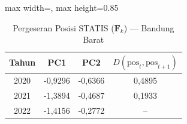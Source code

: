 \begin{table}[H]
\centering
\caption{Pergeseran Posisi STATIS ($\mathbf{F}_k$) --- Bandung Barat} \label{tab:sample1jarak_statis_skor_bandung_barat}
\begin{adjustbox}{max width=\textwidth, max height=0.85\textheight}
\begin{tabular}{|c|c|c|c|}
\hline
\textbf{Tahun} & \textbf{PC1} & \textbf{PC2} & \textbf{$D(\text{pos}_t, \text{pos}_{t+1})$} \\
\hline
2020 & -0,9296 & -0,6366 & 0,4895 \\
2021 & -1,3894 & -0,4687 & 0,1933 \\
2022 & -1,4156 & -0,2772 & -- \\
\hline
\end{tabular}
\end{adjustbox}
\end{table}